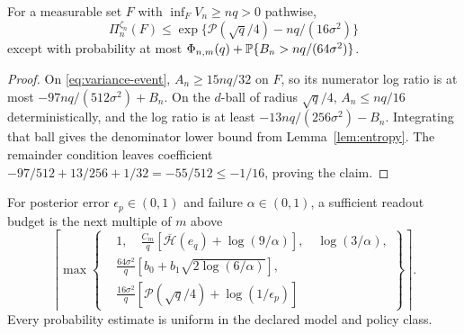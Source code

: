 \begin{theorem}
\label{thm:posterior}
For a measurable set $F$ with $\inf_F V_n\ge nq>0$ pathwise,
\begin{equation}
 \Pi_n^{\zeta_n}(F)\le
 \exp\{\mathcal P(\sqrt q/4)-nq/(16\sigma^2)\}
 \label{eq:posterior-bound}
\end{equation}
except with probability at most
$\Phi_{n,m}(q)+\mathbb P\{B_n>nq/(64\sigma^2)\}$.
\end{theorem}
\begin{proof}
On \eqref{eq:variance-event}, $A_n\ge15nq/32$ on $F$, so its numerator
log ratio is at most $-97nq/(512\sigma^2)+B_n$.
On the $d$-ball of radius $\sqrt q/4$, $A_n\le nq/16$ deterministically,
and the log ratio is at least $-13nq/(256\sigma^2)-B_n$.
Integrating that ball gives the denominator lower bound from
Lemma~\ref{lem:entropy}. The remainder condition leaves coefficient
$-97/512+13/256+1/32=-55/512\le-1/16$, proving the claim.
\end{proof}

For posterior error $\epsilon_p\in(0,1)$ and failure $\alpha\in(0,1)$,
a sufficient readout budget is the next multiple of $m$ above
\begin{equation}
 \left\lceil\max\left\{\begin{aligned}
 &1,\quad\frac{C_m}{q}
 [\overline{\mathcal H}(e_q)+\log(9/\alpha)],\quad\log(3/\alpha),\\
 &\frac{64\sigma^2}{q}[b_0+b_1\sqrt{2\log(6/\alpha)}],\\
 &\frac{16\sigma^2}{q}[\mathcal P(\sqrt q/4)+\log(1/\epsilon_p)]
 \end{aligned}\right\}\right\rceil.
 \label{eq:posterior-budget}
\end{equation}
Every probability estimate is uniform in the declared model and policy class.
